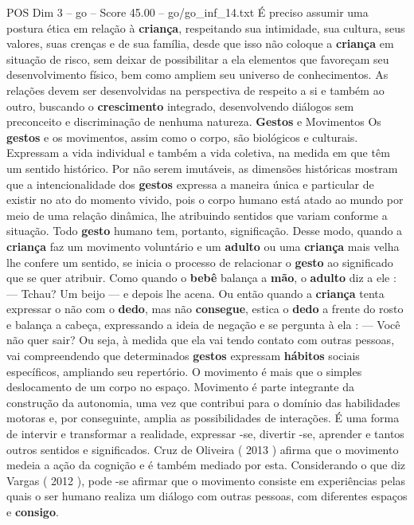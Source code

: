 \begin{textsample}{POS Dim 3 – go – Score 45.00 – go/go\_inf\_14.txt}
É preciso assumir uma postura ética em relação à \textbf{criança}, respeitando sua intimidade, sua cultura, seus valores, suas crenças e de sua família, desde que isso não coloque a \textbf{criança} em situação de risco, sem deixar de possibilitar a ela elementos que favoreçam seu desenvolvimento físico, bem como ampliem seu universo de conhecimentos.
As relações devem ser desenvolvidas na perspectiva de respeito a si e também ao outro, buscando o \textbf{crescimento} integrado, desenvolvendo diálogos sem preconceito e discriminação de nenhuma natureza. \textbf{Gestos} e Movimentos Os \textbf{gestos} e os movimentos, assim como o corpo, são biológicos e culturais.
Expressam a vida individual e também a vida coletiva, na medida em que têm um sentido histórico.
Por não serem imutáveis, as dimensões históricas mostram que a intencionalidade dos \textbf{gestos} expressa a maneira única e particular de existir no ato do momento vivido, pois o corpo humano está atado ao mundo por meio de uma relação dinâmica, lhe atribuindo sentidos que variam conforme a situação.
Todo \textbf{gesto} humano tem, portanto, significação.
Desse modo, quando a \textbf{criança} faz um movimento voluntário e um \textbf{adulto} ou uma \textbf{criança} mais velha lhe confere um sentido, se inicia o processo de relacionar o \textbf{gesto} ao significado que se quer atribuir.
Como quando o \textbf{bebê} balança a \textbf{mão}, o \textbf{adulto} diz a ele : — Tchau?
Um beijo — e depois lhe acena.
Ou então quando a \textbf{criança} tenta expressar o não com o \textbf{dedo}, mas não \textbf{consegue}, estica o \textbf{dedo} a frente do rosto e balança a cabeça, expressando a ideia de negação e se pergunta à ela : — Você não quer sair?
Ou seja, à medida que ela vai tendo contato com outras pessoas, vai compreendendo que determinados \textbf{gestos} expressam \textbf{hábitos} sociais específicos, ampliando seu repertório.
O movimento é mais que o simples deslocamento de um corpo no espaço.
Movimento é parte integrante da construção da autonomia, uma vez que contribui para o domínio das habilidades motoras e, por conseguinte, amplia as possibilidades de interações.
É uma forma de intervir e transformar a realidade, expressar -se, divertir -se, aprender e tantos outros sentidos e significados.
Cruz de Oliveira ( 2013 ) afirma que o movimento medeia a ação da cognição e é também mediado por esta.
Considerando o que diz Vargas ( 2012 ), pode -se afirmar que o movimento consiste em experiências pelas quais o ser humano realiza um diálogo com outras pessoas, com diferentes espaços e \textbf{consigo}.

\end{textsample}
